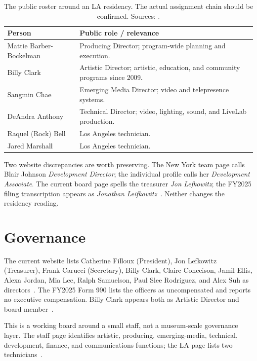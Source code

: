 \documentclass[10pt,letterpaper,twocolumn]{article}
\begin{document}
\begin{table}[H]
\footnotesize\centering\setlength{\tabcolsep}{3pt}
\begin{tabularx}{\columnwidth}{lX}
\toprule
\textbf{Person} & \textbf{Public role / relevance}\\
\midrule
Mattie Barber-Bockelman & Producing Director; program-wide planning and execution.\\
Billy Clark & Artistic Director; artistic, education, and community programs since 2009.\\
Sangmin Chae & Emerging Media Director; video and telepresence systems.\\
DeAndra Anthony & Technical Director; video, lighting, sound, and LiveLab production.\\
Raquel (Rock) Bell & Los Angeles technician.\\
Jared Marshall & Los Angeles technician.\\
\bottomrule
\end{tabularx}
\caption{The public roster around an LA residency. The actual assignment chain should be confirmed. Sources: \citet{chny,chla,chabout}.}
\end{table}

Two website discrepancies are worth preserving. The New York team page calls Blair Johnson \emph{Development Director}; the individual profile calls her \emph{Development Associate}. The current board page spells the treasurer \emph{Jon Lefkowitz}; the FY2025 filing transcription appears as \emph{Jonathan Leifkowitz}~\citep{chabout,ch990}. Neither changes the residency reading.

\section{Governance}

The current website lists Catherine Filloux (President), Jon Lefkowitz (Treasurer), Frank Carucci (Secretary), Billy Clark, Claire Conceison, Jamil Ellis, Alexa Jordan, Mia Lee, Ralph Samuelson, Paul Slee Rodriguez, and Alex Suh as directors~\citep{chabout}. The FY2025 Form 990 lists the officers as uncompensated and reports no executive compensation. Billy Clark appears both as Artistic Director and board member~\citep{ch990}.

This is a working board around a small staff, not a museum-scale governance layer. The staff page identifies artistic, producing, emerging-media, technical, development, finance, and communications functions; the LA page lists two technicians~\citep{chny,chla}.
\end{document}
